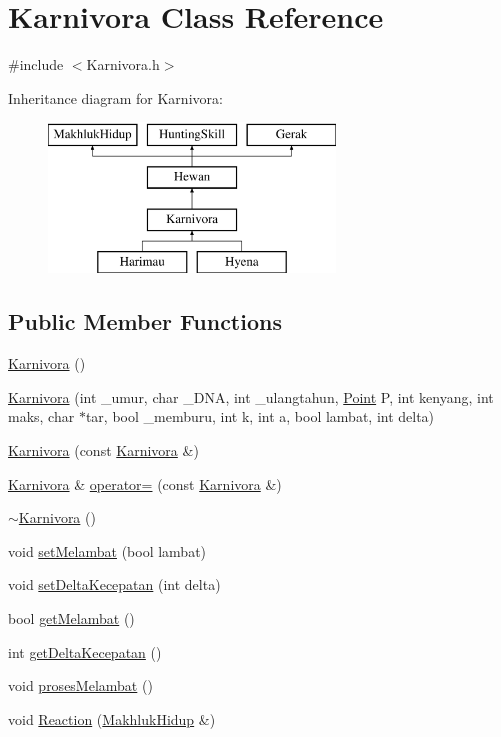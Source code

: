 \hypertarget{class_karnivora}{}\section{Karnivora Class Reference}
\label{class_karnivora}


{\ttfamily \#include $<$Karnivora.\+h$>$}

Inheritance diagram for Karnivora\+:\begin{figure}[H]
\begin{center}
\leavevmode
\includegraphics[height=4.000000cm]{class_karnivora}
\end{center}
\end{figure}
\subsection*{Public Member Functions}
\begin{DoxyCompactItemize}
\item 
\hyperlink{class_karnivora_afd4a31df2afd0c4b453092a4b554d46a}{Karnivora} ()
\item 
\hyperlink{class_karnivora_aa49aa02796b7915613503502a5ef64ee}{Karnivora} (int \+\_\+umur, char \+\_\+\+D\+NA, int \+\_\+ulangtahun, \hyperlink{class_point}{Point} P, int kenyang, int maks, char $\ast$tar, bool \+\_\+memburu, int k, int a, bool lambat, int delta)
\item 
\hyperlink{class_karnivora_a0ad77b06c2cbd1a19f477eb95449afed}{Karnivora} (const \hyperlink{class_karnivora}{Karnivora} \&)
\item 
\hyperlink{class_karnivora}{Karnivora} \& \hyperlink{class_karnivora_a7a89e24705bddf06a2c55a3fdc9d3047}{operator=} (const \hyperlink{class_karnivora}{Karnivora} \&)
\item 
\hyperlink{class_karnivora_ae6aa88535e87ff86244742167d940018}{$\sim$\+Karnivora} ()
\item 
void \hyperlink{class_karnivora_ad5085dc989bcb5ddb709d7351e01f7aa}{set\+Melambat} (bool lambat)
\item 
void \hyperlink{class_karnivora_a7252b3126157047d2467828b63e27766}{set\+Delta\+Kecepatan} (int delta)
\item 
bool \hyperlink{class_karnivora_afed2521496766e61af3f0977686a2fad}{get\+Melambat} ()
\item 
int \hyperlink{class_karnivora_a3668b84ed03d4584b95ffdf0b88fd2cd}{get\+Delta\+Kecepatan} ()
\item 
void \hyperlink{class_karnivora_a8e69eda1144d6789bb6d51aa48b5e569}{proses\+Melambat} ()
\item 
void \hyperlink{class_karnivora_a5835b08fcd4ca1d9d45459fedfceaf21}{Reaction} (\hyperlink{class_makhluk_hidup}{Makhluk\+Hidup} \&)
\end{DoxyCompactItemize}


